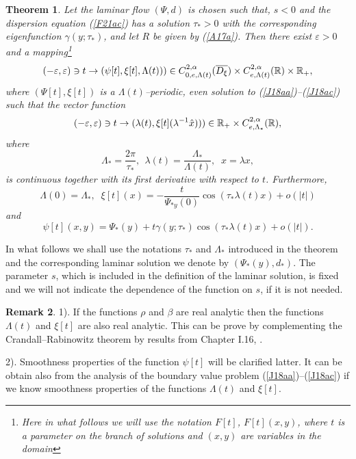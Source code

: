 \documentclass[a4paper,reqno,12pt]{amsart}
\theoremstyle{plain}
\newtheorem{theorem}{Theorem}[section]
\theoremstyle{definition}
\newtheorem{remark}[theorem]{Remark}
\numberwithin{equation}{section}
\begin{document}
\begin{theorem}\label{TA17b} Let the laminar flow $(\Psi,d)$ is chosen such that, $s<0$ and the dispersion  equation (\ref{F21ac}) has a solution $\tau_*>0$ with the corresponding eigenfunction $\gamma(y;\tau_*)$, and let $R$ be given by (\ref{A17a}).
Then there exist $\varepsilon > 0$ and a mapping\footnote{Here in what follows we will use the notation $F[t]$, $F[t](x,y)$, where $t$ is a parameter on the branch of solutions and $(x,y)$ are variables in the domain}
\begin{equation}\label{A17aa}
(-\varepsilon,\varepsilon)\ni t\rightarrow (\psi[t],\xi[t],\Lambda(t)))\in C^{2,\alpha}_{0,e,\Lambda(t)}(\overline{D_\xi})\times C^{2,\alpha}_{e,\Lambda(t)}(\Bbb R)\times\Bbb R_+,
\end{equation}
where $(\Psi[t],\xi[t])$ is a $\Lambda(t)$--periodic, even solution to (\ref{J18aa})--(\ref{J18ac}) such that the vector function
\begin{equation}\label{A17ab}
(-\varepsilon,\varepsilon)\ni t\rightarrow (\lambda(t),\xi[t](\lambda^{-1}\hat{x})))\in \Bbb R_+\times C^{2,\alpha}_{e,\Lambda_*}(\Bbb R),
\end{equation}
where
\begin{equation}\label{A17b}
\Lambda_*=\frac{2\pi}{\tau_*},\:\:\lambda(t)=\frac{\Lambda_*}{\Lambda(t)},\;\;\hat{x}=\lambda x,
\end{equation}
is continuous together with its first derivative with respect to $t$. Furthermore,
\begin{equation}\label{A17ac}
\Lambda(0)=\Lambda_*,\;\;\xi[t](x)=-\frac{t}{\Psi_{*y}(0)}
\cos(\tau_*\lambda(t)x)+o(|t|)
\end{equation}
and
\begin{equation}\label{A17acz}
\psi[t](x,y)=\Psi_*(y)+t\gamma(y;\tau_*)\cos(\tau_*\lambda(t)x)
+o(|t|).
\end{equation}

\end{theorem}
 In what follows we shall use the notations $\tau_*$ and $\Lambda_*$ introduced in the theorem and the corresponding laminar solution we denote by $(\Psi_*(y),d_*)$. The parameter $s$, which is included in the definition of the laminar solution, is fixed and we will not indicate the dependence of the function on $s$, if it is not needed.




\begin{remark}\label{RA25a}
1). If the functions $\rho$ and $\beta$ are real analytic then the functions $\Lambda(t)$ and $\xi[t]$ are also real analytic. This can be prove by complementing
the Crandall--Rabinowitz theorem by results from Chapter I.16, \cite{Ki1}.

2). Smoothness properties of the function $\psi[t]$ will be clarified latter. It can be obtain also from the analysis of the boundary value problem (\ref{J18aa})--(\ref{J18ac}) if we know smoothness properties of the functions $\Lambda(t)$ and $\xi[t]$.
\end{remark}
\end{document}
